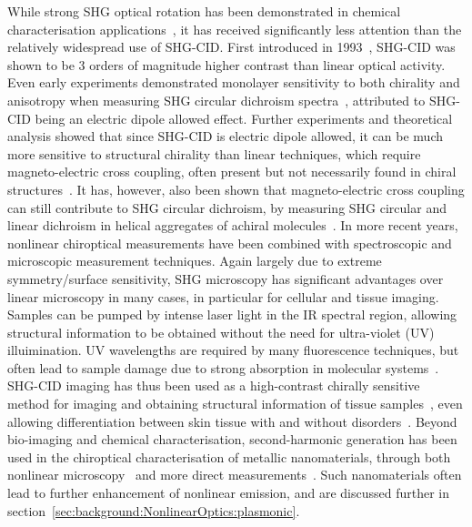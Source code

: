 While strong SHG optical rotation has been demonstrated in chemical characterisation applications~\cite{Byers1994, Pena2006}, it has received significantly less attention than the relatively widespread use of SHG-CID. First introduced in 1993~\cite{Petralli-Mallow1993}, SHG-CID was shown to be 3 orders of magnitude higher contrast than linear optical activity.
Even early experiments demonstrated monolayer sensitivity to both chirality and anisotropy when measuring SHG circular dichroism spectra~\cite{Byers1994a}, attributed to SHG-CID being an electric dipole allowed effect. Further experiments and theoretical analysis showed that since SHG-CID is electric dipole allowed, it can be much more sensitive to structural chirality than linear techniques, which require magneto-electric cross coupling, often present but not necessarily found in chiral structures~\cite{Verbiest1994b}. It has, however, also been shown that magneto-electric cross coupling can still contribute to SHG circular dichroism, by measuring SHG circular and linear dichroism in helical aggregates of achiral molecules~\cite{Fujiwara2004}.
In more recent years, nonlinear chiroptical measurements have been combined with spectroscopic and microscopic measurement techniques. Again largely due to extreme symmetry/surface sensitivity, SHG microscopy has significant advantages over linear microscopy in many cases, in particular for cellular and tissue imaging. 
Samples can be pumped by intense laser light in the IR spectral region, allowing structural information to be obtained without the need for ultra-violet (UV) illuimination. UV wavelengths are required by many fluorescence techniques, but often lead to sample damage due to strong absorption in molecular systems~\cite{Campagnola2011}. 
SHG-CID imaging has thus been used as a high-contrast chirally sensitive method for imaging and obtaining structural information of tissue samples~\cite{Lee2013a, Campbell2016}, even allowing differentiation between skin tissue with and without disorders~\cite{Chen2012}. Beyond bio-imaging and chemical characterisation, second-harmonic generation has been used in the chiroptical characterisation of metallic nanomaterials, through both nonlinear microscopy~\cite{Huttunen2011, Valev2012a, Mamonov2017} and more direct measurements~\cite{Guerrero-Martinez2011, Belardini2014, Hooper2017}. Such nanomaterials often lead to further enhancement of nonlinear emission, and are discussed further in section~\ref{sec:background:NonlinearOptics:plasmonic}. 



